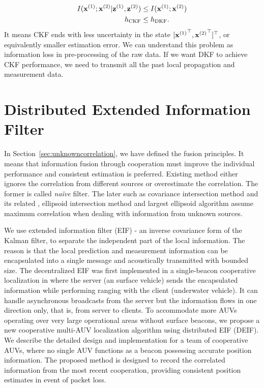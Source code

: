 \begin{equation}
\begin{split}
I({\bf x}^{(1)};{\bf x}^{(2)}|{\bf z}^{(1)},{\bf z}^{(2)})&\leq I({\bf x}^{(1)};{\bf x}^{(2)})  \\
h_\text{CKF}&\leq h_\text{DKF}. \\
\end{split}
\end{equation}
It means CKF ends with less uncertainty in the state $[{{\bf x}^{(1)}}^\top,{{\bf x}^{(2)}}^\top]^\top$, or equivalently smaller estimation error. We can understand this problem as information loss in pre-processing of the raw data. If we want DKF to achieve CKF performance, we need to transmit all the past local propagation and measurement data. 

\section{Distributed Extended Information Filter}

In Section~\ref{sec:unknowncorrelation}, we have defined the fusion principles. It means that information fusion through cooperation must improve the individual performance and consistent estimation is preferred. Existing method either ignores the correlation from different sources or overestimate the correlation. The former is called \textit{na\"ive} filter. The later such as covariance intersection method \cite{julier2001} and its related \cite{Reece2005,Lihao2013A}, ellipsoid intersection method \cite{Sijs2010} and largest ellipsoid algorithm \cite{Benaskeur2002} assume maximum correlation when dealing with information from unknown sources.

We use extended information filter (EIF) - an inverse covariance form of the Kalman filter, to separate the independent part of the local information. The reason is that the local prediction and measurement information can be encapsulated into a single message and acoustically transmitted with bounded size. The decentralized EIF was first implemented in a single-beacon cooperative localization in \cite{Eustice2006} where the server (an surface vehicle) sends the encapsulated information while performing ranging with the client (underwater vehicle). It can handle asynchronous broadcasts from the server but the information flows in one direction only, that is, from server to clients. To accommodate more AUVs operating over very large operational areas without surface beacons, we propose a new cooperative multi-AUV localization algorithm using distributed EIF (DEIF). We describe the detailed design and implementation for a team of cooperative AUVs, where no single AUV functions as a beacon possessing accurate position information. The proposed method is designed to record the correlated information from the most recent cooperation, providing consistent position estimates in event of packet loss.


